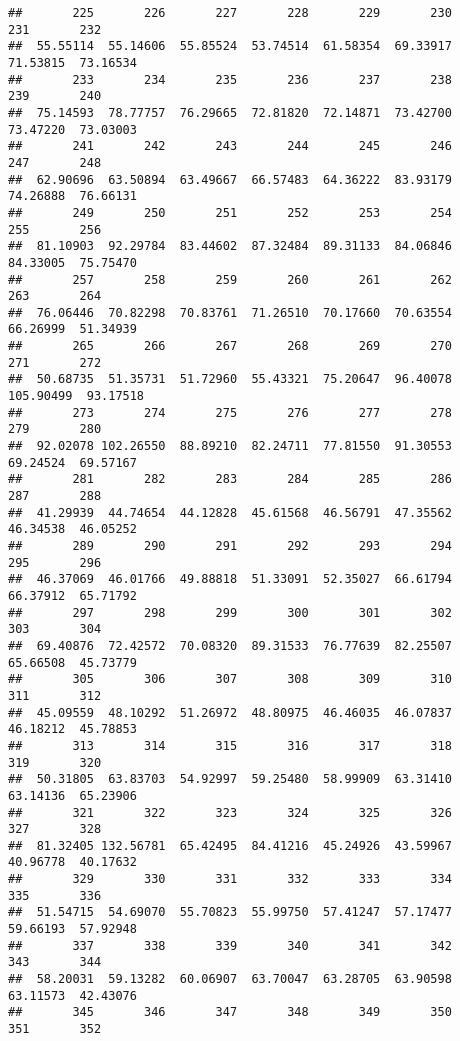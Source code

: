 \documentclass[
]{article}
\begin{document}
\begin{verbatim}
##       225       226       227       228       229       230       231       232 
##  55.55114  55.14606  55.85524  53.74514  61.58354  69.33917  71.53815  73.16534 
##       233       234       235       236       237       238       239       240 
##  75.14593  78.77757  76.29665  72.81820  72.14871  73.42700  73.47220  73.03003 
##       241       242       243       244       245       246       247       248 
##  62.90696  63.50894  63.49667  66.57483  64.36222  83.93179  74.26888  76.66131 
##       249       250       251       252       253       254       255       256 
##  81.10903  92.29784  83.44602  87.32484  89.31133  84.06846  84.33005  75.75470 
##       257       258       259       260       261       262       263       264 
##  76.06446  70.82298  70.83761  71.26510  70.17660  70.63554  66.26999  51.34939 
##       265       266       267       268       269       270       271       272 
##  50.68735  51.35731  51.72960  55.43321  75.20647  96.40078 105.90499  93.17518 
##       273       274       275       276       277       278       279       280 
##  92.02078 102.26550  88.89210  82.24711  77.81550  91.30553  69.24524  69.57167 
##       281       282       283       284       285       286       287       288 
##  41.29939  44.74654  44.12828  45.61568  46.56791  47.35562  46.34538  46.05252 
##       289       290       291       292       293       294       295       296 
##  46.37069  46.01766  49.88818  51.33091  52.35027  66.61794  66.37912  65.71792 
##       297       298       299       300       301       302       303       304 
##  69.40876  72.42572  70.08320  89.31533  76.77639  82.25507  65.66508  45.73779 
##       305       306       307       308       309       310       311       312 
##  45.09559  48.10292  51.26972  48.80975  46.46035  46.07837  46.18212  45.78853 
##       313       314       315       316       317       318       319       320 
##  50.31805  63.83703  54.92997  59.25480  58.99909  63.31410  63.14136  65.23906 
##       321       322       323       324       325       326       327       328 
##  81.32405 132.56781  65.42495  84.41216  45.24926  43.59967  40.96778  40.17632 
##       329       330       331       332       333       334       335       336 
##  51.54715  54.69070  55.70823  55.99750  57.41247  57.17477  59.66193  57.92948 
##       337       338       339       340       341       342       343       344 
##  58.20031  59.13282  60.06907  63.70047  63.28705  63.90598  63.11573  42.43076 
##       345       346       347       348       349       350       351       352 

\end{verbatim}
\end{document}
